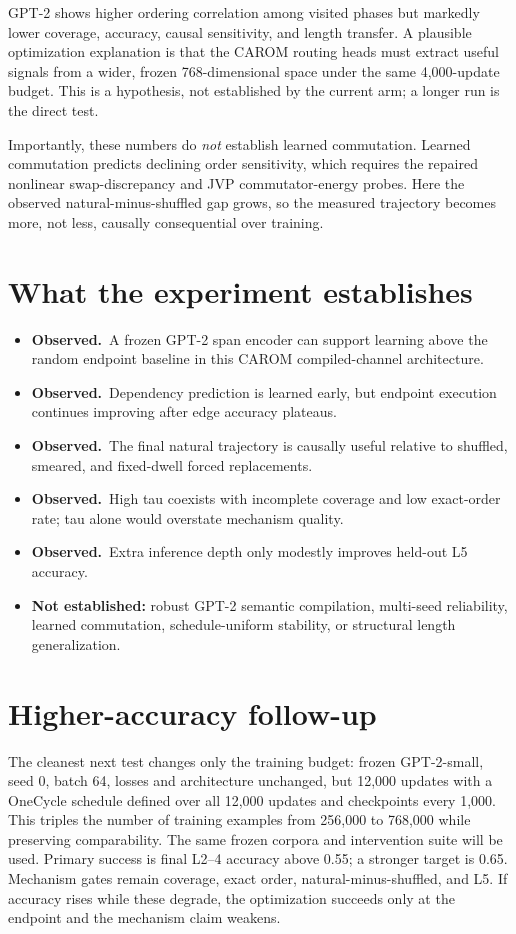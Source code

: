 \documentclass[10pt]{article}
\newcommand{\obs}{\textbf{Observed.}\ }
\begin{document}
GPT-2 shows higher ordering correlation among visited phases but markedly lower
coverage, accuracy, causal sensitivity, and length transfer. A plausible
optimization explanation is that the CAROM routing heads must extract useful
signals from a wider, frozen 768-dimensional space under the same 4,000-update
budget. This is a hypothesis, not established by the current arm; a longer run
is the direct test.

Importantly, these numbers do \emph{not} establish learned commutation. Learned
commutation predicts declining order sensitivity, which requires the repaired
nonlinear swap-discrepancy and JVP commutator-energy probes. Here the observed
natural-minus-shuffled gap grows, so the measured trajectory becomes more, not
less, causally consequential over training.

\section{What the experiment establishes}

\begin{itemize}
\item \obs A frozen GPT-2 span encoder can support learning above the random
endpoint baseline in this CAROM compiled-channel architecture.
\item \obs Dependency prediction is learned early, but endpoint execution
continues improving after edge accuracy plateaus.
\item \obs The final natural trajectory is causally useful relative to shuffled,
smeared, and fixed-dwell forced replacements.
\item \obs High tau coexists with incomplete coverage and low exact-order rate;
tau alone would overstate mechanism quality.
\item \obs Extra inference depth only modestly improves held-out L5 accuracy.
\item \textbf{Not established:} robust GPT-2 semantic compilation, multi-seed
reliability, learned commutation, schedule-uniform stability, or structural
length generalization.
\end{itemize}

\section{Higher-accuracy follow-up}

The cleanest next test changes only the training budget: frozen GPT-2-small,
seed 0, batch 64, losses and architecture unchanged, but 12,000 updates with a
OneCycle schedule defined over all 12,000 updates and checkpoints every 1,000.
This triples the number of training examples from 256,000 to 768,000 while
preserving comparability. The same frozen corpora and intervention suite will be
used. Primary success is final L2--4 accuracy above 0.55; a stronger target is
0.65. Mechanism gates remain coverage, exact order, natural-minus-shuffled, and
L5. If accuracy rises while these degrade, the optimization succeeds only at
the endpoint and the mechanism claim weakens.
\end{document}
